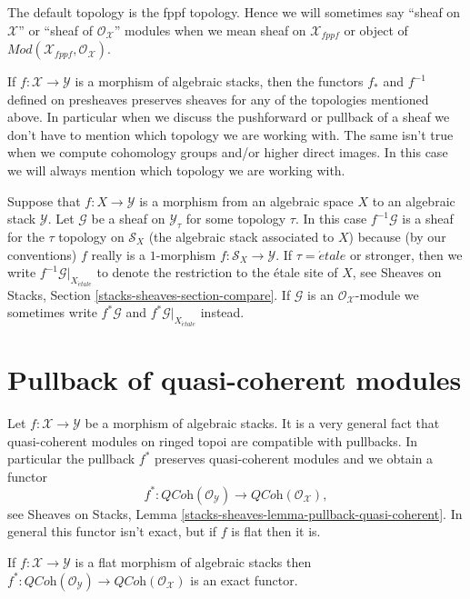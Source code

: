 \medskip\noindent
The default topology is the fppf topology. Hence we will sometimes
say ``sheaf on $\mathcal{X}$'' or ``sheaf of $\mathcal{O}_\mathcal{X}$''
modules when we mean sheaf on $\mathcal{X}_{fppf}$ or object of
$\textit{Mod}(\mathcal{X}_{fppf}, \mathcal{O}_\mathcal{X})$.

\medskip\noindent
If $f : \mathcal{X} \to \mathcal{Y}$ is a morphism of algebraic
stacks, then the functors $f_*$ and $f^{-1}$ defined on presheaves
preserves sheaves for any of the topologies mentioned above. In particular
when we discuss the pushforward or pullback of a sheaf we don't have to
mention which topology we are working with. The same isn't true
when we compute cohomology groups and/or higher direct images. In this
case we will always mention which topology we are working with.

\medskip\noindent
Suppose that $f : X \to \mathcal{Y}$ is a morphism from an algebraic
space $X$ to an algebraic stack $\mathcal{Y}$. Let $\mathcal{G}$ be
a sheaf on $\mathcal{Y}_\tau$ for some topology $\tau$. In this case
$f^{-1}\mathcal{G}$ is a sheaf for the $\tau$ topology on $\mathcal{S}_X$
(the algebraic stack associated to $X$) because (by our conventions) $f$
really is a $1$-morphism $f : \mathcal{S}_X \to \mathcal{Y}$.
If $\tau = \acute{e}tale$ or stronger, then we write
$f^{-1}\mathcal{G}|_{X_{\acute{e}tale}}$
to denote the restriction to the \'etale site of $X$, see
Sheaves on Stacks, Section \ref{stacks-sheaves-section-compare}.
If $\mathcal{G}$ is an $\mathcal{O}_\mathcal{X}$-module we sometimes
write $f^*\mathcal{G}$ and $f^*\mathcal{G}|_{X_{\acute{e}tale}}$
instead.




\section{Pullback of quasi-coherent modules}
\label{section-pullback}

\noindent
Let $f : \mathcal{X} \to \mathcal{Y}$ be a morphism of algebraic stacks.
It is a very general fact that quasi-coherent modules on ringed topoi
are compatible with pullbacks. In particular the pullback $f^*$ preserves
quasi-coherent modules and we obtain a functor
$$
f^* :
\textit{QCoh}(\mathcal{O}_\mathcal{Y})
\longrightarrow
\textit{QCoh}(\mathcal{O}_\mathcal{X}),
$$
see Sheaves on Stacks, Lemma
\ref{stacks-sheaves-lemma-pullback-quasi-coherent}.
In general this functor isn't exact, but if $f$ is flat then it is.

\begin{lemma}
\label{lemma-flat-pullback-quasi-coherent}
If $f : \mathcal{X} \to \mathcal{Y}$ is a flat morphism of algebraic stacks
then $f^* : \textit{QCoh}(\mathcal{O}_\mathcal{Y}) \to
\textit{QCoh}(\mathcal{O}_\mathcal{X})$ is an exact functor.
\end{lemma}

